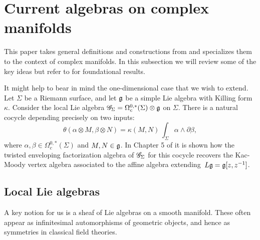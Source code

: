 \section{Current algebras on complex manifolds}

This paper takes general definitions and constructions from \cite{CG1} and specializes them to the context of complex manifolds.
In this subsection we will review some of the key ideas but refer to \cite{CG1} for foundational results.

\begin{rmk}
It might help to bear in mind the one-dimensional case that we wish to extend. 
Let $\Sigma$ be a Riemann surface, and let $\mathfrak g$ be a simple Lie algebra with Killing form $\kappa$.
Consider the local Lie algebra $\mathscr G_\Sigma = \Omega^{0,*}_c(\Sigma) \otimes \mathfrak g$ on $\Sigma$.
There is a natural cocycle depending precisely on two inputs:
\[
\theta( \alpha \otimes M, \beta \otimes N) = \kappa(M,N) \, \int_\Sigma \alpha \wedge \partial \beta  ,
\]
where $\alpha, \beta \in \Omega^{0,*}_c(\Sigma)$ and $M,N \in \mathfrak g$.
In Chapter 5 of \cite{CG1} it is shown how the twisted enveloping factorization algebra of $\mathscr G_\Sigma$ for this cocycle recovers the Kac-Moody vertex algebra associated to the affine algebra extending~$L\mathfrak g = \mathfrak g[z,z^{-1}]$.
\end{rmk}



\subsection{Local Lie algebras}

A key notion for us is a sheaf of Lie algebras on a smooth manifold.
These often appear as infinitesimal automorphisms of geometric objects,
and hence as symmetries in classical field theories.

